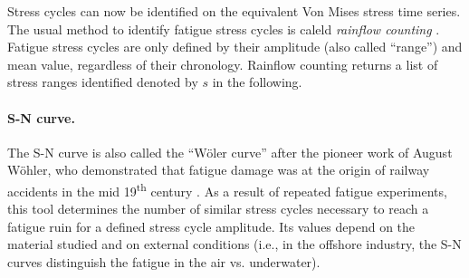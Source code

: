 Stress cycles can now be identified on the equivalent Von Mises stress time series. 
The usual method to identify fatigue stress cycles is caleld \textit{rainflow counting} \citep{dowling_1972}. 
Fatigue stress cycles are only defined by their amplitude (also called ``range'') and mean value, regardless of their chronology. 
Rainflow counting returns a list of stress ranges identified denoted by $s$ in the following. 


\paragraph{S-N curve.}
The S-N curve is also called the ``W\"oler curve'' after the pioneer work of August W\"ohler, who demonstrated that fatigue damage was at the origin of railway accidents in the mid 19\textsuperscript{th} century \citep{schutz_1996_history_fatigue}. 
As a result of repeated fatigue experiments, this tool determines the number of similar stress cycles necessary to reach a fatigue ruin for a defined stress cycle amplitude. 
Its values depend on the material studied and on external conditions (i.e., in the offshore industry, the S-N curves distinguish the fatigue in the air vs. underwater). 

